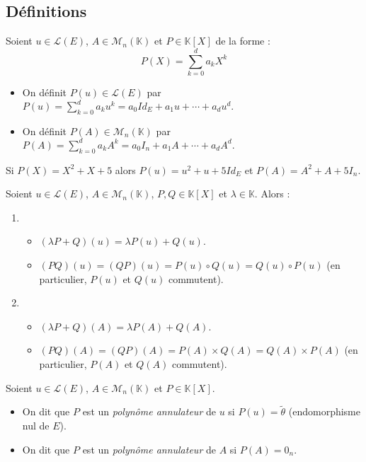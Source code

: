 \documentclass[french,11pt,twoside]{VcCours}
\begin{document}
\subsection{Définitions}

\begin{Definition}{} Soient $u \in \mathcal{L}(E)$, $A \in \mathcal{M}_n(\mathbb{K})$ et $P \in \mathbb{K}[X]$ de la forme :
$$ P(X) = \sum_{k=0}^d a_k X^k $$
\begin{itemize}
\item On définit $P(u) \in \mathcal{L}(E)$ par $P(u) = \sum_{k=0}^d a_k u^k = a_0 Id_E + a_1 u + \cdots +a_d u^d.$
\item On définit $P(A) \in \mathcal{M}_n(\mathbb{K})$ par $P(A) = \sum_{k=0}^d a_k A^k = a_0 I_n + a_1 A + \cdots +a_d A^d.$
\end{itemize}
\end{Definition}

\begin{Exemple}{} Si $P(X) = X^2+X+5$ alors $P(u) = u^2+u+5 Id_E$ et $P(A) = A^2+A+5I_n$.
\end{Exemple}

\begin{Proposition}{} Soient $u \in \mathcal{L}(E)$, $A \in \mathcal{M}_n(\mathbb{K})$, $P,Q \in \mathbb{K}[X]$ et $\lambda \in \mathbb{K}$. Alors :
\begin{enumerate}
\item
\begin{itemize}
\item $(\lambda P + Q)(u) = \lambda P(u) + Q(u)$.
\item $(PQ)(u)=(QP)(u) = P(u) \circ Q(u) = Q(u) \circ P(u)$ (en particulier, $P(u)$ et $Q(u)$ commutent).
\end{itemize}
\item
\begin{itemize}
\item $(\lambda P + Q)(A) = \lambda P(A) + Q(A)$.
\item $(PQ)(A)=(QP)(A) = P(A) \times Q(A) = Q(A) \times P(A)$ (en particulier, $P(A)$ et $Q(A)$ commutent).
\end{itemize}
\end{enumerate}
\end{Proposition}

\begin{Definition}{} Soient $u \in \mathcal{L}(E)$, $A \in \mathcal{M}_n(\mathbb{K})$ et $P \in \mathbb{K}[X]$. 
\begin{itemize}
\item On dit que $P$ est un \emph{polynôme annulateur} de $u$ si $P(u) = \tilde{\theta}$ (endomorphisme nul de $E$).
\item On dit que $P$ est un \emph{polynôme annulateur} de $A$ si $P(A)=0_n$.
\end{itemize}
\end{Definition}
\end{document}
